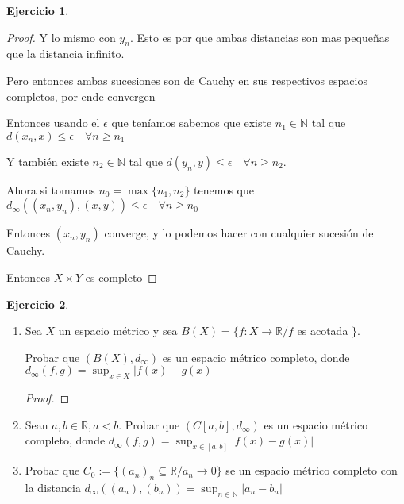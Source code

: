 \documentclass[11pt]{report}
\newcommand{\R}{\mathbb{R}}
\newcommand{\N}{\mathbb{N}}
\newcommand{\ra}{\rightarrow}
\theoremstyle{definition}
\newtheorem{ej}{Ejercicio}
\begin{document}
\begin{ej}
\begin{proof}
			Y lo mismo con $y_n$. Esto es por que ambas distancias son mas pequeñas que la distancia infinito.

			Pero entonces ambas sucesiones son de Cauchy en sus respectivos espacios completos, por ende convergen

			Entonces usando el $\epsilon$ que teníamos sabemos que existe $n_1 \in \N$ tal que $d(x_n,x) \leq \epsilon \quad \forall n\geq n_1$ 

			Y también existe $n_2 \in \N$ tal que $d(y_n,y) \leq \epsilon \quad \forall n\geq n_2$.

			Ahora si tomamos $n_0 = \max\{n_1,n_2\}$ tenemos que $d_{\infty}((x_n,y_n),(x,y)) \leq \epsilon \quad \forall n \geq n_0$

			Entonces $(x_n,y_n)$ converge, y lo podemos hacer con cualquier sucesión de Cauchy.

			Entonces $X\times Y$ es completo
		\end{proof}
	\end{ej}

	\begin{ej}
		\begin{enumerate}
			\item Sea $X$ un espacio métrico y sea $B(X) = \{f: X\ra \R / f $ es acotada $\}$. 

				Probar que $(B(X),d_{\infty})$ es un espacio métrico completo, donde $d_{\infty}(f,g) = \sup_{x\in X}|f(x)-g(x)|$

				\begin{proof}
					
				\end{proof}
				
				
			\item Sean $a,b\in \R, a < b$. Probar que $(C[a,b],d_{\infty})$ es un espacio métrico completo, donde $d_{\infty}(f,g) = \sup_{x\in [a,b]}|f(x)-g(x)|$
			\item Probar que $C_0 := \{(a_n)_n \subseteq \R / a_n \ra 0 \}$ se un espacio métrico completo con la distancia $d_{\infty}((a_n),(b_n)) = \sup_{n\in\N} |a_n-b_n|$
	
		\end{enumerate}
	\end{ej}
\end{document}
